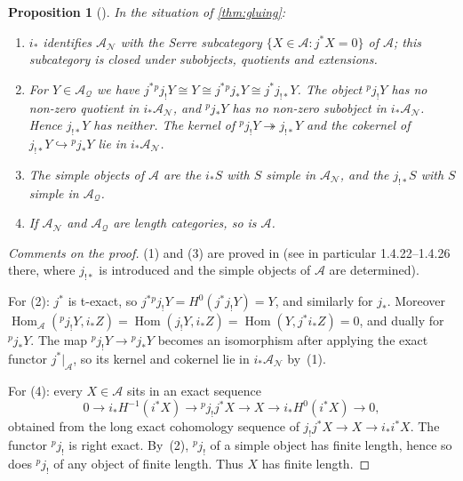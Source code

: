 \documentclass[11pt,reqno]{amsart}
\theoremstyle{plain}
\newtheorem{proposition}[theorem]{Proposition}
\theoremstyle{definition}
\theoremstyle{remark}
\DeclareMathOperator{\Hom}{Hom}
\newcommand{\cA}{\mathcal{A}}
\newcommand{\cN}{\mathcal{N}}
\newcommand{\cQ}{\mathcal{Q}}
\begin{document}
\begin{proposition}[{\cite[\S1.4]{BBD82}}]\label{prop:glued-heart}
In the situation of \cref{thm:gluing}:
\begin{enumerate}
\item $i_*$ identifies $\cA_\cN$ with the Serre subcategory $\{X\in\cA:j^*X=0\}$ of $\cA$; this subcategory is closed under subobjects, quotients and extensions.
\item For $Y\in\cA_\cQ$ we have $j^*{}^p\!j_!Y\cong Y\cong j^*{}^p\!j_*Y\cong j^*j_{!*}Y$. The object ${}^p\!j_!Y$ has no non-zero quotient in $i_*\cA_\cN$, and ${}^p\!j_*Y$ has no non-zero subobject in $i_*\cA_\cN$. Hence $j_{!*}Y$ has neither. The kernel of ${}^p\!j_!Y\twoheadrightarrow j_{!*}Y$ and the cokernel of $j_{!*}Y\hookrightarrow {}^p\!j_*Y$ lie in $i_*\cA_\cN$.
\item The simple objects of $\cA$ are the $i_*S$ with $S$ simple in $\cA_\cN$, and the $j_{!*}S$ with $S$ simple in $\cA_\cQ$.
\item If $\cA_\cN$ and $\cA_\cQ$ are length categories, so is $\cA$.
\end{enumerate}
\end{proposition}

\begin{proof}[Comments on the proof]
(1) and (3) are proved in \cite[\S1.4]{BBD82} (see in particular 1.4.22--1.4.26 there, where $j_{!*}$ is introduced and the simple objects of $\cA$ are determined).

For (2): $j^*$ is t-exact, so $j^*{}^p\!j_!Y=H^0(j^*j_!Y)=Y$, and similarly for $j_*$. Moreover $\Hom_\cA({}^p\!j_!Y,i_*Z)=\Hom(j_!Y,i_*Z)=\Hom(Y,j^*i_*Z)=0$, and dually for ${}^p\!j_*Y$. The map ${}^p\!j_!Y\to{}^p\!j_*Y$ becomes an isomorphism after applying the exact functor $j^*|_\cA$, so its kernel and cokernel lie in $i_*\cA_\cN$ by~(1).

For (4): every $X\in\cA$ sits in an exact sequence
\[0\to i_*H^{-1}(i^*X)\to{}^p\!j_!j^*X\to X\to i_*H^0(i^*X)\to0,\]
obtained from the long exact cohomology sequence of $j_!j^*X\to X\to i_*i^*X$. The functor ${}^p\!j_!$ is right exact. By~(2), ${}^p\!j_!$ of a simple object has finite length, hence so does ${}^p\!j_!$ of any object of finite length. Thus $X$ has finite length.
\end{proof}
\end{document}
